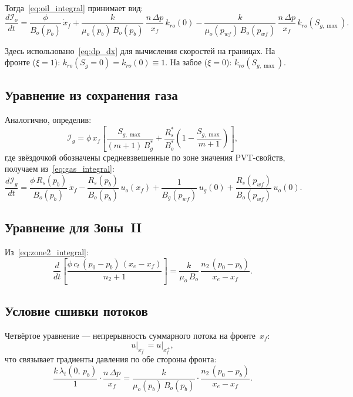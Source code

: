 \documentclass[12pt,a4paper]{article}
\begin{document}
Тогда~\eqref{eq:oil_integral} принимает вид:
\begin{equation}\label{eq:ode_oil}
  \frac{d\mathcal{I}_o}{dt}
  = \frac{\phi}{B_o(p_b)}\,\dot{x}_f
  + \frac{k}{\mu_o(p_b)\,B_o(p_b)}\,
  \frac{n\,\Delta p}{x_f}\,k_{ro}(0)
  - \frac{k}{\mu_o(p_{wf})\,B_o(p_{wf})}\,
  \frac{n\,\Delta p}{x_f}\,k_{ro}(S_{g,\max}).
\end{equation}

Здесь использовано~\eqref{eq:dp_dx} для вычисления скоростей на границах.
На фронте ($\xi=1$): $k_{ro}(S_g=0) = k_{ro}(0) \equiv 1$.
На забое ($\xi=0$): $k_{ro}(S_{g,\max})$.

\subsection{Уравнение из сохранения газа}

Аналогично, определив:
\[
  \mathcal{I}_g = \phi\,x_f\left[
    \frac{S_{g,\max}}{(m+1)\,B_g^*}
    + \frac{R_s^*}{B_o^*}\left(1 - \frac{S_{g,\max}}{m+1}\right)
  \right],
\]
где звёздочкой обозначены средневзвешенные по зоне значения PVT-свойств,
получаем из~\eqref{eq:gas_integral}:
\begin{equation}\label{eq:ode_gas}
  \frac{d\mathcal{I}_g}{dt}
  = \frac{\phi\,R_s(p_b)}{B_o(p_b)}\,\dot{x}_f
  - \frac{R_s(p_b)}{B_o(p_b)}\,u_o(x_f)
  + \frac{1}{B_g(p_{wf})}\,u_g(0)
  + \frac{R_s(p_{wf})}{B_o(p_{wf})}\,u_o(0).
\end{equation}

\subsection{Уравнение для Зоны~II}

Из~\eqref{eq:zone2_integral}:
\begin{equation}\label{eq:ode_zone2}
  \frac{d}{dt}\left[
    \frac{\phi\,c_t\,(p_0 - p_b)\,(x_e - x_f)}{n_2 + 1}
  \right]
  = \frac{k}{\mu_o\,B_o}\,
  \frac{n_2\,(p_0 - p_b)}{x_e - x_f}.
\end{equation}

\subsection{Условие сшивки потоков}

Четвёртое уравнение --- непрерывность суммарного потока на фронте~$x_f$:
\begin{equation}\label{eq:flux_matching}
  u\big|_{x_f^-} = u\big|_{x_f^+},
\end{equation}
что связывает градиенты давления по обе стороны фронта:
\begin{equation}\label{eq:gradient_matching}
  \frac{k\,\lambda_t(0,\,p_b)}{1}\cdot\frac{n\,\Delta p}{x_f}
  = \frac{k}{\mu_o(p_b)\,B_o(p_b)}\cdot
  \frac{n_2\,(p_0 - p_b)}{x_e - x_f}.
\end{equation}
\end{document}
